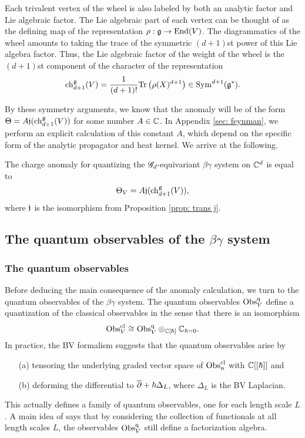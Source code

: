 \documentclass[10pt]{amsart}
\begin{document}
Each trivalent vertex of the wheel is also labeled by both an analytic factor and Lie algebraic factor. 
The Lie algebraic part of each vertex can be thought of as the defining map of the representation $\rho : \mathfrak g \to {\rm End}(V)$. 
The diagrammatics of the wheel amounts to taking the trace of the symmetric $(d+1)$st power of this Lie algebra factor. 
Thus, the Lie algebraic factor of the weight of the wheel is the $(d+1)$st component of the character of the representation
\[
{\rm ch}_{d+1}^\mathfrak g(V) = \frac{1}{(d+1)!} {\rm Tr}\left(\rho(X)^{d+1}\right) \in {\rm Sym}^{d+1}(\mathfrak g^*) .
\]

By these symmetry arguments, we know that the anomaly will be of the form $\Theta = A \mathfrak j ({\rm ch}_{d+1}^{\mathfrak g}(V))$ for some number $A \in \mathbb C$.
In Appendix \ref{sec: feynman}, we perform an explicit calculation of this constant $A$, which depend on the specific form of the analytic propagator and heat kernel. 
We arrive at the following.

\begin{prop}\label{prop: bg anomaly}
The charge anomaly for quantizing the $\mathscr G_d$-equivariant $\beta\gamma$ system on $\mathbb C^d$ is equal to
\[
\Theta_V = A  \mathfrak j ({\rm ch}_{d+1}^{\mathfrak g}(V)),
\]
where $\mathfrak j$ is the isomorphism from Proposition \ref{prop: trans j}.
\end{prop}

\subsection{The quantum observables of the $\beta\gamma$ system}

\subsubsection{The quantum observables}

Before deducing the main consequence of the anomaly calculation, we turn to the quantum observables of the $\beta\gamma$ system. 
The quantum observables ${\rm Obs}^{{\rm q}}_V$ define a quantization of the classical observables in the sense that there is an isomorphism
\[
{\rm Obs}^{{\rm cl}}_V \cong {\rm Obs}^{\rm q}_V \otimes_{\mathbb C[\hbar]} \mathbb C_{\hbar = 0} .
\]
In practice, the BV formalism suggests that the quantum observables arise by 
\begin{enumerate}
\item[(a)] tensoring the underlying graded vector space of ${\rm Obs}^{\rm cl}_n$ with $\mathbb C[[\hbar]]$ and
\item[(b)] deforming the differential to $\overline{\partial} +\hbar \Delta_L$, where $\Delta_L$ is the BV Laplacian.
\end{enumerate}
This actually defines a family of quantum observables, one for each length scale $L$. 
A main idea of \cite{CG2} says that by considering the collection of functionals at all length scales $L$, the observables ${\rm Obs}^{\rm q}_V$ still define a factorization algebra. 
\end{document}
